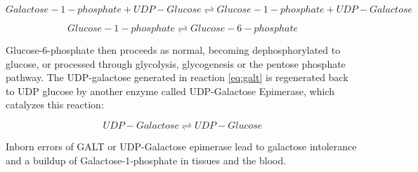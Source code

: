 \documentclass{tufte-handout}
\begin{document}
\begin{equation} \label{eq:galt}
Galactose-1-phosphate + UDP-Glucose \rightleftharpoons Glucose-1-phosphate + UDP-Galactose
\end{equation}

\begin{equation}
Glucose-1-phosphate \rightleftharpoons Glucose-6-phosphate
\end{equation}

Glucose-6-phosphate then proceeds as normal, becoming dephosphorylated to glucose, or processed through glycolysis, glycogenesis or the pentose phosphate pathway.  The UDP-galactose generated in reaction \ref{eq:galt} is regenerated back to UDP glucose by another enzyme called UDP-Galactose Epimerase, which catalyzes this reaction:

\begin{equation}
UDP-Galactose \rightleftharpoons UDP-Glucose
\end{equation}

Inborn errors of GALT or UDP-Galactose epimerase lead to galactose intolerance and a buildup of Galactose-1-phosphate in tissues and the blood.



\end{document}

